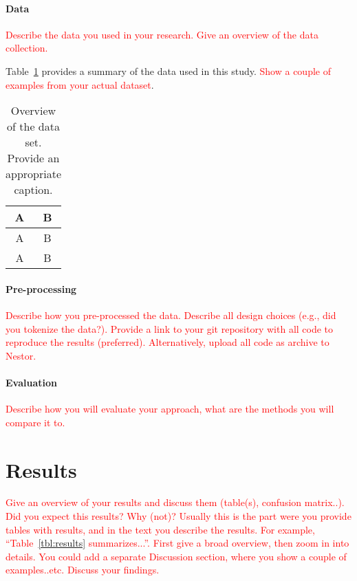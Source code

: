 \documentclass[11pt]{article}
\begin{document}
\paragraph{Data} %

\textcolor{red}{Describe the data you used in your research. Give an overview of the data collection.}

Table~\ref{tbl:stats} provides a summary of the data used in this study.  \textcolor{red}{Show a couple of examples from your actual dataset}.
\begin{table}[hbtp]\centering
\begin{tabular}{|cc|}
\hline
A & B \\
\hline
A & B \\
A & B \\
\hline
\end{tabular}
\caption{Overview of the data set. Provide an appropriate caption.}
\label{tbl:stats}
\end{table}


\paragraph{Pre-processing} \textcolor{red}{Describe how you pre-processed the data. Describe all design choices (e.g., did you tokenize the data?). 
Provide a link to your git repository with all code to reproduce the results (preferred). Alternatively, upload all code as archive to Nestor.}

\paragraph{Evaluation}
\textcolor{red}{Describe how you will evaluate your approach, what are the methods you will compare it to. }

\section{Results}


\textcolor{red}{Give an overview of your results and discuss them (table(s), confusion matrix..). Did you expect this results? Why (not)? Usually this is the part were you provide tables with results, and in the text you describe the results. 
For example, ``Table~\ref{tbl:results} summarizes...''. First give a broad overview, then zoom in into details. You could add a separate Discussion section, where you show a couple of examples..etc. Discuss your findings.} 
\end{document}
